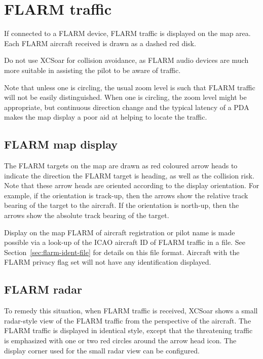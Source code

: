 \section{FLARM traffic}

If connected to a FLARM device, FLARM traffic is displayed on the map
area.  Each FLARM aircraft received is drawn as a dashed red disk.

\warning Do not use XCSoar for collision avoidance, as
FLARM audio devices are much more suitable in assisting the pilot to be
aware of traffic.

Note that unless one is circling, the usual zoom level is such that
FLARM traffic will not be easily distinguished. When one is circling,
the zoom level might be appropriate, but continuous direction change and
the typical latency of a PDA makes the map display a poor aid at helping
to locate the traffic.


\subsection*{FLARM map display}

The FLARM targets on the map are drawn as red coloured 
arrow heads to indicate the direction the FLARM target is
heading, as well as the collision risk.  Note that these
arrow heads are oriented according to the display orientation.  For example, if 
the orientation is track-up, then the arrows show the relative track bearing of
the target to the aircraft.  If the orientation is north-up, then the arrows show the
absolute track bearing of the target.

Display on the map FLARM of aircraft registration or pilot name is
made possible via a look-up of the ICAO aircraft ID of FLARM traffic
in a file.  See Section~\ref{sec:flarm-ident-file} for details on this
file format.  Aircraft with the FLARM privacy flag set will not have
any identification displayed.


\subsection*{FLARM radar}

To remedy this situation, when FLARM traffic is received, XCSoar shows a 
small radar-style view of the FLARM
traffic from the perspective of the aircraft.  The FLARM traffic is
displayed in identical style, except that the threatening traffic is emphasized 
with one or two red circles around the arrow head icon.  The display corner used 
for the small radar view can be configured.

